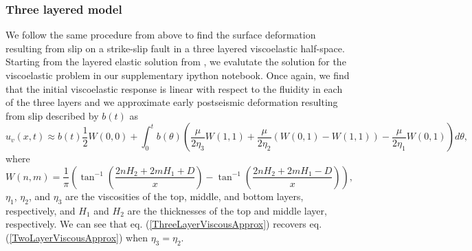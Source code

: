 \documentclass[fleqn,12pt]{article}
\begin{document}
\subsubsection{Three layered model}
We follow the same procedure from above to find the surface
deformation resulting from slip on a strike-slip fault in a three
layered viscoelastic half-space.  Starting from the layered elastic
solution from \citet{CJ1972}, we evalutate the solution for the
viscoelastic problem in our supplementary ipython notebook. Once
again, we find that the initial viscoelastic response is linear with
respect to the fluidity in each of the three layers and we approximate
early postseismic deformation resulting from slip described by $b(t)$
as
\begin{equation}\label{ThreeLayerViscousApprox}
u_v(x,t) \approx b(t)\frac{1}{2} W(0,0) + 
         \int_0^tb(\theta)\left(\frac{\mu}{2\eta_3}W(1,1)
                               +\frac{\mu}{2\eta_2}(W(0,1) - W(1,1))
                               -\frac{\mu}{2\eta_1}W(0,1)\right)d\theta,
\end{equation}
where
\begin{equation}
  W(n,m) = \frac{1}{\pi}\left(\tan^{-1}\left(\frac{2nH_2 + 2mH_1 + D}{x}\right) - 
                              \tan^{-1}\left(\frac{2nH_2 + 2mH_1 - D}{x}\right)\right),
\end{equation}
$\eta_1$, $\eta_2$, and $\eta_3$ are the viscosities of the top,
middle, and bottom layers, respectively, and $H_1$ and $H_2$ are the
thicknesses of the top and middle layer, respectively.  We can see
that eq. (\ref{ThreeLayerViscousApprox}) recovers eq.
(\ref{TwoLayerViscousApprox}) when $\eta_3 = \eta_2$.
\end{document}
